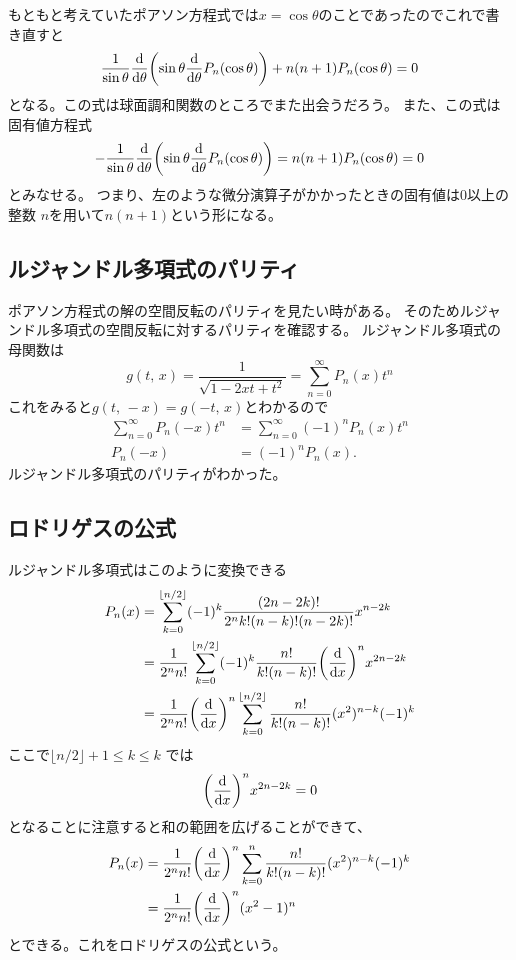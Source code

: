 \documentclass[../../master.tex]{subfiles}
\begin{document}
もともと考えていたポアソン方程式では\(x=\cos\theta\)のことであったのでこれで書き直すと
\begin{equation}
	\frac{1}{\sin\theta}\dv{\theta}\qty(\sin\theta\dv{\theta}P_n(\cos\theta)) + n(n+1)P_n(\cos\theta) =0 \label{eq:legendre_dif_eq2}
\end{equation}
となる。この式は球面調和関数のところでまた出会うだろう。
また、この式は固有値方程式
\begin{equation}
	-\frac{1}{\sin\theta}\dv{\theta}\qty(\sin\theta\dv{\theta}P_n(\cos\theta)) = n(n+1)P_n(\cos\theta) =0
\end{equation}
とみなせる。
つまり、左のような微分演算子がかかったときの固有値は0以上の整数
\(n\)を用いて\(n(n+1)\)という形になる。

\subsection{ルジャンドル多項式のパリティ}
ポアソン方程式の解の空間反転のパリティを見たい時がある。
そのためルジャンドル多項式の空間反転に対するパリティを確認する。
ルジャンドル多項式の母関数は
\begin{equation}
	g(t,\,x) = \frac{1}{\sqrt{1-2xt + t^2}} = \sum_{n=0}^{\infty}P_n(x)t^n
\end{equation}
これをみると\(g(t,\,-x)=g(-t,\,x)\)とわかるので
\begin{align}
	\sum_{n=0}^{\infty} P_n(-x)t^n & = \sum_{n=0}^{\infty} (-1)^n P_n(x)t^n \\
	P_n(-x)                        & = (-1)^n P_n(x).
\end{align}
ルジャンドル多項式のパリティがわかった。

\subsection{ロドリゲスの公式}
ルジャンドル多項式はこのように変換できる
\begin{align}
	P_n(x) & = \sum_{k=0}^{\lfloor n/2 \rfloor}(-1)^k \frac{(2n-2k)!}{2^n k!(n-k)!(n-2k)!}x^{n-2k}                \\
	       & =\frac{1}{2^n n!}\sum_{k=0}^{\lfloor n/2 \rfloor}(-1)^k \frac{n!}{k!(n-k)!}\qty(\dv{x})^nx^{2n-2k}   \\
	       & =\frac{1}{2^n n!}\qty(\dv{x})^n\sum_{k=0}^{\lfloor n/2 \rfloor} \frac{n!}{k!(n-k)!}(x^2)^{n-k}(-1)^k
\end{align}
ここで\(\lfloor n/2 \rfloor + 1 \leq k \leq k\) では
\begin{equation}
	\qty(\dv{x})^n x^{2n-2k} =0
\end{equation}
となることに注意すると和の範囲を広げることができて、
\begin{align}
	P_n(x) & = \frac{1}{2^n n!}\qty(\dv{x})^n\sum_{k=0}^{n} \frac{n!}{k!(n-k)!}(x^2)^{n-k}(-1)^k \\
	       & = \frac{1}{2^n n!}\qty(\dv{x})^n(x^2-1)^n
\end{align}
とできる。これをロドリゲスの公式という。
\end{document}
